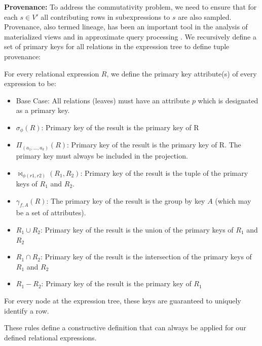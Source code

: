 \noindent\textbf{Provenance: } To address the commutativity problem, we need to ensure that for each $s \in V'$ all contributing rows in subexpressions to $s$ are also sampled. 
Provenance, also termed lineage, has been an important tool in the analysis of materialized views \cite{DBLP:journals/vldb/CuiW03} and in approximate query processing \cite{DBLP:conf/sigmod/ZengGMZ14}. 
We recursively define a set of primary keys for all relations in the expression tree to define tuple provenance:
\begin{definition} \label{pk}
For every relational expression $R$, we define the primary key attribute(s) of every expression to be:
\begin{itemize}[noitemsep]
\item Base Case: All relations (leaves) must have an attribute $p$ which is designated as a primary key. 
\item $\sigma_{\phi}(R)$: Primary key of the result is the primary key of R 
\item $\Pi_{(a_1,...,a_k)}(R)$: Primary key of the result is the primary key of R. The primary key must always be included in the projection.
\item $\bowtie_{\phi (r1,r2)}(R_1,R_2)$: Primary key of the result is the tuple of the primary keys of $R_1$ and $R_2$. 
\item $\gamma_{f,A}(R)$: The primary key of the result is the group by key $A$ (which may be a set of attributes).
\item $R_1 \cup R_2$: Primary key of the result is the union of the primary keys of $R_1$ and $R_2$
\item $R_1 \cap R_2$: Primary key of the result is the intersection of the primary keys of $R_1$ and $R_2$
\item $R_1 - R_2$: Primary key of the result is the primary key of $R_1$
\end{itemize}
For every node at the expression tree, these keys are guaranteed to uniquely identify a row.
\end{definition}
These rules define a constructive definition that can always be applied for our defined relational expressions. 

\vspace{0.5em} 

